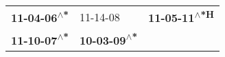 \begin{supertabular}{lll}
 \textbf{11-04-06\textsuperscript{$\wedge$*}} &                    11-14-08\textsuperscript{} &  \textbf{11-05-11\textsuperscript{$\wedge$*H}} \\
 \textbf{11-10-07\textsuperscript{$\wedge$*}} &  \textbf{10-03-09\textsuperscript{$\wedge$*}} &                                                \\
\end{supertabular}
